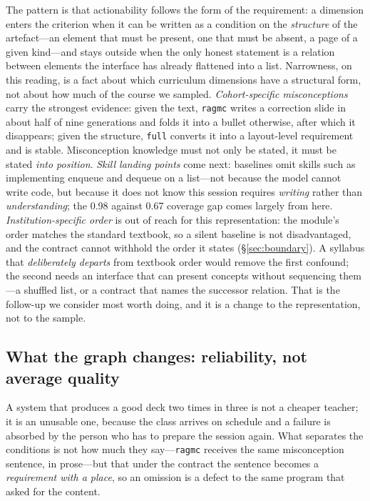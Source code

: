 \documentclass[review,12pt]{elsarticle}
\renewcommand{\_}{\kgunderscore\allowbreak}
\newcommand{\id}[1]{\texttt{#1}}
\begin{document}
The pattern is that actionability follows the form of the requirement:
a dimension enters the criterion when it can be written as a condition on the
\emph{structure} of the artefact---an element that must be present, one that
must be absent, a page of a given kind---and stays outside when the only honest
statement is a relation between elements the interface has already flattened
into a list. Narrowness, on this reading, is a fact about which curriculum
dimensions have a structural form, not about how much of the course we sampled.
\emph{Cohort-specific misconceptions} carry the strongest evidence: given the
text, \id{rag\_mc} writes a correction slide in about half of nine generations
and folds it into a bullet otherwise, after which it disappears; given the
structure, \id{full} converts it into a layout-level requirement and is stable.
Misconception knowledge must not only be stated, it must be stated
\emph{into position}. \emph{Skill landing points} come next: baselines omit
skills such as implementing enqueue and dequeue on a list---not because the
model cannot write code, but because it does not know this session requires
\emph{writing} rather than \emph{understanding}; the 0.98 against 0.67 coverage
gap comes largely from here. \emph{Institution-specific order} is out of reach
for this representation: the module's order matches the standard textbook, so a
silent baseline is not disadvantaged, and the contract cannot withhold the order
it states (\S\ref{sec:boundary}). A syllabus that \emph{deliberately departs} from
textbook order would remove the first confound; the second needs an interface
that can present concepts without sequencing them---a shuffled list, or a
contract that names the successor relation. That is the follow-up we consider
most worth doing, and it is a change to the representation, not to the sample.

\subsection{What the graph changes: reliability, not average quality}

A system that produces a good deck two times in three is not a cheaper teacher;
it is an unusable one, because the class arrives on schedule and a failure is
absorbed by the person who has to prepare the session again. What separates the
conditions is not how much they say---\id{rag\_mc} receives the same
misconception sentence, in prose---but that under the contract the sentence
becomes a \emph{requirement with a place}, so an omission is a defect to the
same program that asked for the content.
\end{document}

